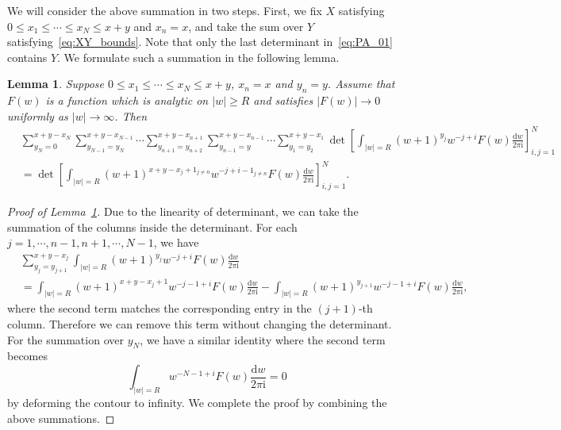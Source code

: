 \documentclass{article}
\newtheorem{lm}[thm]{Lemma}
\numberwithin{equation}{section}
\newcommand{\ddbar}[2]{\frac{{\mathrm d}#1}{2\pi {\mathrm i}#2}}
\begin{document}
We will consider the above summation in two steps. First, we fix $X$ satisfying $0\le x_1\le\cdots\le x_N \le x+y$ and $x_n=x$, and take the sum over $Y$ satisfying~\eqref{eq:XY_bounds}. Note that only the last determinant in~\eqref{eq:PA_01} contains $Y$. We formulate such a summation in the following lemma.

\begin{lm}
	\label{lem:sum_Y}
	Suppose $0\le x_1\le\cdots\le x_N\le x+y$, $x_n=x$ and $y_n=y$. Assume that $F(w)$ is a function which is analytic on $|w|\ge R$ and satisfies $|F(w)|\to 0$ uniformly as $|w|\to\infty$. Then
	\begin{equation*}
		\begin{split}
		&\sum_{y_N=0}^{x+y-x_N}
		 \sum_{y_{N-1}=y_N}^{x+y-x_{N-1}}
		 \cdots 
		 \sum_{y_{n+1}=y_{n+2}}^{x+y-x_{n+1}}
		 \sum_{y_{n-1}=y}^{x+y-x_{n-1}}
		 \cdots
		 \sum_{y_1=y_2}^{x+y-x_1}
		 \det\left[ \int_{|w|=R} 
		            (w+1)^{y_j}w^{-j+i}F(w)
		            \ddbar{w}{}
		     \right]_{i,j=1}^N\\
		&= \det\left[
		          \int_{|w|=R}
		                        (w+1)^{x+y-x_j+1_{j\ne n}}w^{-j+i-1_{j\ne n}}F(w)
		                    \ddbar{w}{}
		       \right]_{i,j=1}^N.
		\end{split}
	\end{equation*}
\end{lm} 
\begin{proof}[Proof of Lemma~\ref{lem:sum_Y}]
	Due to the linearity of determinant, we can take the summation of the columns inside the determinant. For each $j=1,\cdots,n-1,n+1,\cdots,N-1$, we have
	\begin{equation*}
		\begin{split}
		&\sum_{y_{j}=y_{j+1}}^{x+y-x_j} 
	  	  \int_{|w|=R} 
		  (w+1)^{y_j}w^{-j+i}F(w)
		  \ddbar{w}{}\\
		  &
		 =\int_{|w|=R} 
		  (w+1)^{x+y-x_j+1}w^{-j-1+i}F(w)
		  \ddbar{w}{}
		  -\int_{|w|=R} 
		  (w+1)^{y_{j+1}}w^{-j-1+i}F(w)
		  \ddbar{w}{},
		\end{split}
	\end{equation*}
where the second term matches the corresponding entry in the $(j+1)$-th column. Therefore we can remove this term without changing the determinant. For the summation over $y_N$, we have a similar identity where the second term becomes
\begin{equation*}
	\int_{|w|=R} 
	w^{-N-1+i}F(w)
	\ddbar{w}{}=0
\end{equation*}
by deforming the contour to infinity. We complete the proof by combining the above summations.
\end{proof}
\end{document}
